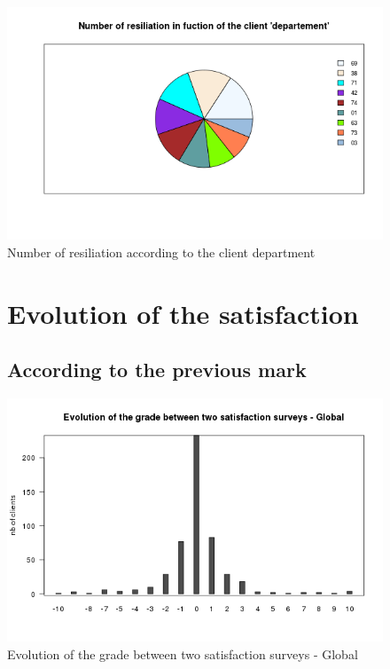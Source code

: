 \documentclass[a4paper, 11pt]{article}
\begin{document}
        \begin{figure}[!ht]
        	\centering
                \includegraphics[height = 10 cm]{Valentin/Number_of_resiliation_in_fuction_of_the_client_departement.png}
                \caption{Number of resiliation according to the client department}
                \label{fig:resiliation_dep1}
        \end{figure}
        
        \begin{figure}[!ht]
			\section{Evolution of the satisfaction}
				\subsection{According to the previous mark}
			\label{app:evolution}
                \centering
                \includegraphics[height = 10 cm]{Remi/Evolution_of_the_grade_between_two_satisfaction_surveys_-_Global.png}
                \caption{Evolution of the grade between two satisfaction surveys - Global}
                \label{fig:e_Global}
        \end{figure}
\end{document}
